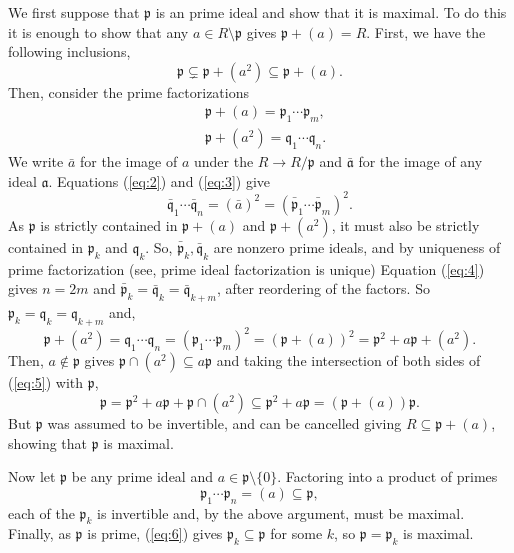 \documentclass[12pt]{article}
\begin{document}
We first suppose that $\mathfrak{p}$ is an  prime ideal and show that it is maximal.
To do this it is enough to show that any $a\in R\setminus\mathfrak{p}$ gives $\mathfrak{p}+(a)=R$. First, we have the following inclusions,
\begin{equation*}
\mathfrak{p}\subsetneq\mathfrak{p}+(a^2)\subseteq\mathfrak{p}+(a).
\end{equation*}
Then, consider the prime factorizations
\begin{align}
&\mathfrak{p}+(a)=\mathfrak{p}_1\cdots\mathfrak{p}_m,\label{eq:2}\\
&\mathfrak{p}+(a^2)=\mathfrak{q}_1\cdots\mathfrak{q}_n.\label{eq:3}
\end{align}
We write $\bar a$ for the image of $a$ under the  $R\rightarrow R/\mathfrak{p}$ and $\mathfrak{\bar a}$ for the image of any ideal $\mathfrak{a}$. Equations (\ref{eq:2}) and (\ref{eq:3}) give
\begin{equation}\label{eq:4}
\mathfrak{\bar q}_1\cdots\mathfrak{\bar q}_n=(\bar a)^2=(\mathfrak{\bar p}_1\cdots\mathfrak{\bar p}_m)^2.
\end{equation}
As $\mathfrak{p}$ is strictly contained in $\mathfrak{p}+(a)$ and $\mathfrak{p}+(a^2)$, it must also be strictly contained in $\mathfrak{p}_k$ and $\mathfrak{q}_k$. So, $\mathfrak{\bar p}_k,\mathfrak{\bar q}_k$ are nonzero prime ideals, and by uniqueness of prime factorization (see, prime ideal factorization is unique) Equation (\ref{eq:4}) gives $n=2m$ and $\mathfrak{\bar p}_k=\mathfrak{\bar q}_k=\mathfrak{\bar q}_{k+m}$, after reordering of the factors. So $\mathfrak{p}_k=\mathfrak{q}_k=\mathfrak{q}_{k+m}$ and,
\begin{equation}\label{eq:5}
\mathfrak{p}+(a^2)
=\mathfrak{q}_1\cdots\mathfrak{q}_n
= \left(\mathfrak{p}_1\cdots\mathfrak{p}_m\right)^2
=\left(\mathfrak{p}+(a)\right)^2 = \mathfrak{p}^2+a\mathfrak{p}+(a^2).
\end{equation}
Then, $a\not\in\mathfrak{p}$ gives $\mathfrak{p}\cap(a^2)\subseteq a\mathfrak{p}$ and taking the intersection of both sides of (\ref{eq:5}) with $\mathfrak{p}$,
\begin{equation*}
\mathfrak{p}=\mathfrak{p}^2+a\mathfrak{p}+\mathfrak{p}\cap(a^2)\subseteq\mathfrak{p}^2+a\mathfrak{p}=\left(\mathfrak{p}+(a)\right)\mathfrak{p}.
\end{equation*}
But $\mathfrak{p}$ was assumed to be invertible, and can be cancelled giving $R\subseteq\mathfrak{p}+(a)$, showing that $\mathfrak{p}$ is maximal.

Now let $\mathfrak{p}$ be any prime ideal and $a\in\mathfrak{p}\setminus\{0\}$. Factoring into a product of primes
\begin{equation}\label{eq:6}
\mathfrak{p}_1\cdots\mathfrak{p}_n=(a)\subseteq\mathfrak{p},
\end{equation}
each of the $\mathfrak{p}_k$ is invertible and, by the above argument, must be maximal. Finally, as $\mathfrak{p}$ is prime, (\ref{eq:6}) gives $\mathfrak{p}_k\subseteq\mathfrak{p}$ for some $k$, so $\mathfrak{p}=\mathfrak{p}_k$ is maximal.

\end{document}
